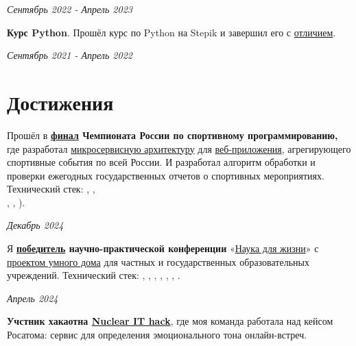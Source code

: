 \documentclass[margin,line]{resume}
\begin{document}
\begin{resume}
  \hfill \textsl{Сентябрь 2022 - Апрель 2023}

  \textbf{Курс Python}. Прошёл курс по Python на Stepik и завершил его с
  \href{https://github.com/alchemmist/CV/blob/main/attachments/stepik-python-course.pdf}{отличием}.

  \vspace{-3mm}

  \hfill \textsl{Сентябрь 2021 - Апрель 2022}

  \section{\mysidestyle Достижения}
  Прошёл в
  \textbf{\href{https://github.com/alchemmist/CV/blob/main/attachments/russian-chemp-final.pdf}{финал}
    Чемпионата России по спортивному
  программированию,} где разработал
  \href{https://github.com/alchemmist/CV/blob/main/attachments/architect.pdf}{микросервисную
  архитектуру} для
  \href{https://github.com/alchemmist/sportporg}{веб-приложения},
  агрегирующего спортивные события по
  всей России. И разработал алгоритм обработки и проверки ежегодных
  государственных
  отчетов о спортивных мероприятиях. Технический стек:
  , , \\
  ,
  ,
).

\vspace{-6mm}

\hfill \textsl{Декабрь 2024}

Я
\textbf{\href{https://github.com/alchemmist/CV/blob/main/attachments/scince-for-life-win.pdf}{победитель}
научно-практической конференции}
«\href{https://conf.profil.mos.ru/academ}{Наука для
жизни}» с \href{https://github.com/smart-cab/}{проектом умного
дома} для частных и государственных
образовательных учреждений. Технический стек: ,
, , ,
, , .
\vspace{-6mm}

\hfill \textsl{Апрель 2024}

\textbf{Учстник хакаотна \href{https://nuclearhack.mephi.ru/}{Nuclear
IT hack}}, где моя команда работала
над кейсом Росатома: сервис для определения эмоционального тона онлайн-встреч.

\vspace{-6mm}


\end{resume}
\end{document}
